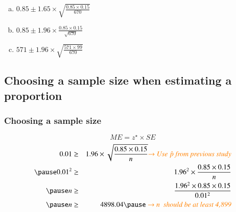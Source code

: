 
\begin{frame}


\begin{enumerate}[(a)]
 
\item $0.85 \pm 1.65 \times \sqrt{\frac{0.85 \times 0.15}{670}}$
\item $0.85 \pm 1.96 \times \frac{0.85 \times 0.15}{\sqrt{670}}$
\item $571 \pm 1.96 \times \sqrt{\frac{571 \times 99}{670}}$
\end{enumerate}

\end{frame}


%
%
%


\subsection{Choosing a sample size when estimating a proportion}


\begin{frame}
\frametitle{Choosing a sample size}

\pause
\[ ME = z^\star \times SE\]
\pause
\begin{eqnarray*}
0.01 &\ge& 1.96 \times \sqrt{\frac{0.85 \times 0.15}{n}} \orange{$\rightarrow$ \text{Use $\hat{p}$ from previous study}} \\
\pause
0.01^2 &\ge& 1.96^2 \times \frac{0.85 \times 0.15}{n} \\
\pause
n &\ge& \frac{1.96^2 \times 0.85 \times 0.15}{0.01^2} \\
\pause
n &\ge& 4898.04 \pause \orange{~$\rightarrow$ n \text{ should be at least 4,899}}
\end{eqnarray*}

\end{frame}

